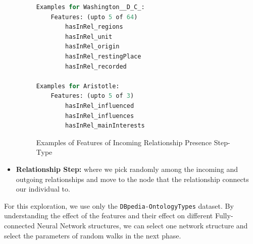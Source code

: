 \documentclass[runningheads,a4paper]{IEEEtran}
\begin{document}
\begin{itemize}
\begin{figure}[t]
\begin{lstlisting}[language=Python,basicstyle=\tiny, frame=single]
Examples for Washington__D_C_: 
	Features: (upto 5 of 64)
		hasInRel_regions
		hasInRel_unit
		hasInRel_origin
		hasInRel_restingPlace
		hasInRel_recorded

Examples for Aristotle: 
	Features: (upto 5 of 3)
		hasInRel_influenced
		hasInRel_influences
		hasInRel_mainInterests
\end{lstlisting}
\caption{Examples of Features of Incoming Relationship Presence Step-Type}
\label{inRelExamples}
\end{figure}

     \item \textbf{Relationship Step:} where we pick randomly among the incoming and outgoing relationships and move to the node that the relationship connects our individual to. 
  \end{itemize}

For this exploration, we use only the \texttt{DBpedia-OntologyTypes} dataset. By understanding the effect of the features and their effect on different Fully-connected Neural Network structures, we can select one network structure and select the parameters of random walks in the next phase. 
\end{document}
